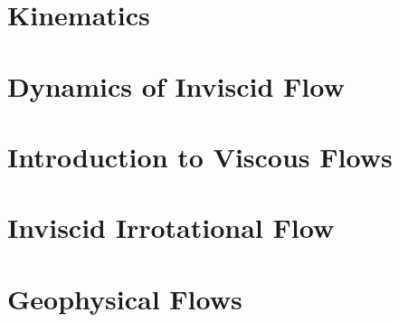 \documentclass[british,11pt,a4paper]{report}
\begin{document}
\maketitle
\tableofcontents

\chapter{Kinematics}

\chapter{Dynamics of Inviscid Flow}

\chapter{Introduction to Viscous Flows}

\chapter{Inviscid Irrotational Flow}

\chapter{Geophysical Flows}
%
\end{document}
